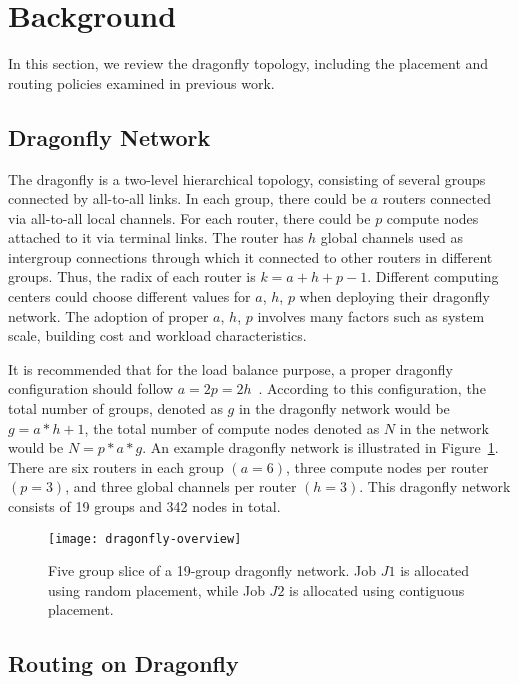 
\section{Background}
\label{sec:background}

In this section, we review the dragonfly topology, including the placement and routing policies examined in previous work. 

\subsection{Dragonfly Network}
\label{sec:network}
The dragonfly is a two-level hierarchical topology, consisting of several groups connected by all-to-all links. In each group, there could be $a$ routers connected via all-to-all local channels. For each router, there could be $p$ compute nodes attached to it via terminal links. The router has $h$ global channels used as intergroup connections through which it connected to other routers in different groups. Thus, the radix of each router is $k = a+h+p-1$. Different computing centers could choose different values for  $a$, $h$, $p$ when deploying their dragonfly network. The adoption of proper $a$, $h$, $p$ involves many factors such as system scale, building cost and workload characteristics. 

It is recommended that for the load balance purpose, a proper dragonfly configuration should follow $a=2p=2h$~\cite{kim-micro}. According to this configuration, the total number of groups, denoted as $g$ in the dragonfly network would be $g = a*h+1 $, the total number of compute nodes denoted as $N$ in the network would be $N = p*a*g $. An example dragonfly network is illustrated in Figure~\ref{fig:dragonfly-overview}. There are six routers in each group $(a=6)$, three compute nodes per router $(p=3)$, and three global channels per router $(h=3)$. This dragonfly network consists of 19 groups and 342 nodes in total.

\begin{figure}[h!] 
  \centering
  \texttt{[image: dragonfly-overview]}
  \caption{Five group slice of a 19-group dragonfly network. Job $J1$ is allocated using random placement, while Job $J2$ is allocated using contiguous placement.}
  \label{fig:dragonfly-overview}
\end{figure}


\subsection{Routing on Dragonfly}
\label{sec:routing-schemes}

